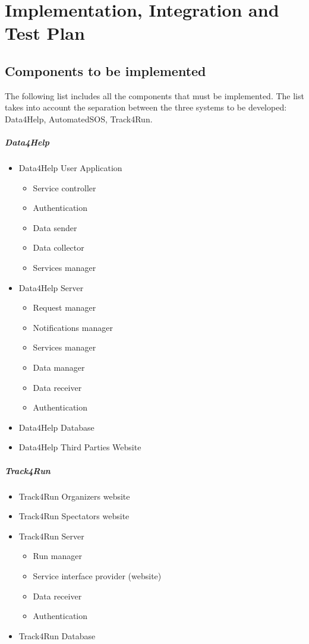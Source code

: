 
 \chapter{Implementation, Integration and Test Plan}

	\section{Components to be implemented\label{sect:5.1}}
		The following list includes all the components that must be implemented. The list takes into account the separation between the three systems to be developed: Data4Help, AutomatedSOS, Track4Run.
		\paragraph{Data4Help}
		\begin{itemize}
			\item{Data4Help User Application}
				\begin{itemize}
					\item{Service controller}
					\item{Authentication}
					\item{Data sender}
					\item{Data collector}
					\item{Services manager}
				\end{itemize}
			\item{Data4Help Server}
				\begin{itemize}
					\item{Request manager}
					\item{Notifications manager}
					\item{Services manager}
					\item{Data manager}
					\item{Data receiver}
					\item{Authentication}
				\end{itemize}
			\item{Data4Help Database}
			\item{Data4Help Third Parties Website}
		\end{itemize}
		\paragraph{Track4Run}
		\begin{itemize}
			\item{Track4Run Organizers website}
			\item{Track4Run Spectators website}
			\item{Track4Run Server}
				\begin{itemize}
					\item{Run manager}
					\item{Service interface provider (website)}
					\item{Data receiver}
					\item{Authentication}
				\end{itemize}
			\item{Track4Run Database}
		\end{itemize}
